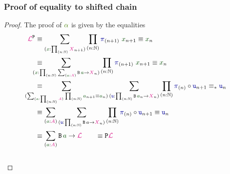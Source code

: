 \documentclass[xelatex,mathserif,serif,notheorems]{beamer} %
\theoremstyle{plain} %
\theoremstyle{definition}
\theoremstyle{remark}
\newcommand*{\lemref}[1]{\hyperref[lem:#1]{Lemma~\ref*{lem:#1}}}
\newcommand*{\term}[1]{\textcolor{green!30!black}{#1}} %
\newcommand*{\pathterm}[1]{\textcolor{green!65!red!75!black}{#1}}
\newcommand*{\type}[1]{\textcolor{magenta!90!black}{#1}}
\newcommand*{\function}[1]{\textcolor{blue!60!black}{\ensuremath{\mathtt{#1}}}}
\newcommand*{\typeformer}[1]{\ensuremath{\mathtt{#1}}}
\newcommand*{\functor}[1]{\ensuremath{\mathbf{\mathtt{#1}}}}
\newcommand{\setlengths}{
  \setlength{\abovedisplayskip}{4pt}
  \setlength{\belowdisplayskip}{4pt}
  \setlength{\abovedisplayshortskip}{2pt}
  \setlength{\belowdisplayshortskip}{2pt}
}
\begin{document}
\begin{frame}
  \frametitle{Proof of equality to shifted chain}
  \begin{proof}\setlengths
    The proof of \(\pathterm{\alpha}\) is given by the equalities
    \begin{align}
      \type{\mathcal{L}}^{\functor{P}} &\equiv \sum_{(\term{x} : \prod_{(n : \mathbb{N})} \type{X}_{n+1})} \prod_{(n : \mathbb{N})} \function{\pi}_{(n+1)}~\term{x}_{n+1} \equiv \term{x}_{n} \\
      &\equiv \hspace{-6mm} \sum_{(\term{x} : \prod_{(n : \mathbb{N})} \sum_{(\term{a} : \type{A})} \typeformer{B}\,\term{a} \rightarrow \type{X}_n)} \prod_{(n : \mathbb{N})} \function{\pi}_{(n+1)}~\term{x}_{n+1} \equiv \term{x}_{n} \label{eq:alpha-unfold}\\
      &\equiv \hspace{-10mm} \sum_{(\sum_{(\term{a} : \prod_{(n : \mathbb{N})} \type{A})} \prod_{(n : \mathbb{N})} \term{a}_{n+1} \equiv \term{a}_n)} \sum_{(\function{u} : \prod_{(n : \mathbb{N})} \typeformer{B}\,\term{a}_n \rightarrow \type{X}_n)} \prod_{(n : \mathbb{N})} \function{\pi}_{(n)} \circ \function{u}_{n+1} \equiv_* \function{u}_n \label{eq:alpha-swap}\\
      &\equiv \sum_{(\term{a} : \type{A})} \sum_{(\function{u} : \prod_{(n : \mathbb{N})} \typeformer{B}\,a \rightarrow \type{X}_n)} \prod_{(n : \mathbb{N})} \function{\pi}_{(n)} \circ \function{u}_{n+1} \equiv \function{u}_n \label{eq:alpha-limit-collapse} \\
      &\equiv \sum_{(\term{a} : \type{A})} \typeformer{B}\,\term{a} \rightarrow \type{\mathcal{L}} \label{eq:alpha-cone} \qquad \equiv \functor{P}\type{\mathcal{L}}
    \end{align}
    ~\\[-6mm]
  \end{proof}
\end{frame}
\end{document}
